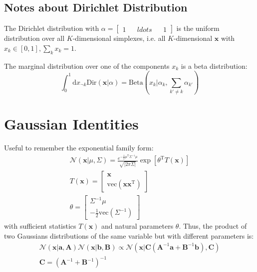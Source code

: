 \documentclass[a4paper]{article}
\begin{document}
\subsection{Notes about Dirichlet Distribution}
The Dirichlet distribution with $\alpha = \begin{bmatrix}1 && ldots && 1 \end{bmatrix}$ is the uniform distribution over all $K$-dimensional simplexes, i.e. all $K$-dimensional $\mathbf{x}$ with $x_k \in [0,1], \sum_k x_k = 1$.

The marginal distribution over one of the components $x_k$ is a beta distribution:
\[ \int_0^1 \textrm{d}x_{\neg k} \textrm{Dir}(\mathbf{x}|\alpha)  = \textrm{Beta}\left(x_k|\alpha_k, \sum_{k' \neq k}\alpha_{k'}\right) \]

\section{Gaussian Identities}
Useful to remember the exponential family form:
\begin{gather*}
\mathcal{N}(\mathbf{x}|\mu,\Sigma) = \frac{e^{-\frac{1}{2}\mu^\textrm{T}\Sigma^{-1}\mu}}{\sqrt{|2\pi\Sigma|}} \exp\left[ \theta^\textrm{T}T(\mathbf{x}) \right] \\
T(\mathbf{x}) = \begin{bmatrix} \mathbf{x} \\ \textrm{vec}(\mathbf{xx}^\textrm{T}) \end{bmatrix} \\
\theta = \begin{bmatrix} \Sigma^{-1}\mu \\ -\frac{1}{2}\textrm{vec}(\Sigma^{-1}) \end{bmatrix}
\end{gather*}
with sufficient statistics $T(\mathbf{x})$ and natural parameters $\theta$. Thus, the product of two Gaussians distributions of the same variable but with different parameters is:
\begin{gather*}
\mathcal{N}(\mathbf{x}|\mathbf{a},\mathbf{A})\mathcal{N}(\mathbf{x}|\mathbf{b},\mathbf{B}) \propto \mathcal{N}(\mathbf{x}|\mathbf{C}(\mathbf{A}^{-1}\mathbf{a} + \mathbf{B}^{-1}\mathbf{b}),\mathbf{C}) \\
\mathbf{C} = (\mathbf{A}^{-1} + \mathbf{B}^{-1})^{-1}
\end{gather*}
\end{document}
